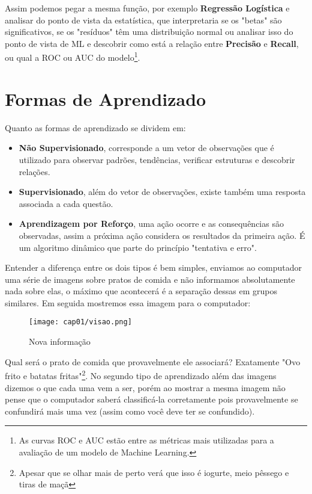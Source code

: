 Assim podemos pegar a mesma função, por exemplo \textbf{Regressão Logística} e analisar do ponto de vista da estatística, que interpretaria se os "betas" são significativos, se os "resíduos" têm uma distribuição normal ou analisar isso do ponto de vista de ML e descobrir como está a relação entre \textbf{Precisão} e \textbf{Recall}, ou qual a ROC ou AUC do modelo\footnote{As curvas ROC e AUC estão entre as métricas mais utilizadas para a avaliação de um modelo de Machine Learning.}.

\section{Formas de Aprendizado}
Quanto as formas de aprendizado se dividem em:
\begin{itemize}[noitemsep]
	\item \textbf{Não Supervisionado}, corresponde a um vetor de observações que é utilizado para observar padrões, tendências, verificar estruturas e descobrir relações.
	\item \textbf{Supervisionado}, além do vetor de observações, existe também uma resposta associada a cada questão.
	\item \textbf{Aprendizagem por Reforço}, uma ação ocorre e as consequências são observadas, assim a próxima ação considera os resultados da primeira ação. É um algoritmo dinâmico que parte do princípio "tentativa e erro".
\end{itemize}

Entender a diferença entre os dois tipos é bem simples, enviamos ao computador uma série de imagens sobre pratos de comida e não informamos absolutamente nada sobre elas, o máximo que acontecerá é a separação dessas em grupos similares. Em seguida mostremos essa imagem para o computador:
\begin{figure}[H]
	\centering\texttt{[image: cap01/visao.png]}
	\caption{Nova informação}
\end{figure}

Qual será o prato de comida que provavelmente ele associará? Exatamente "Ovo frito e batatas fritas"\footnote{Apesar que se olhar mais de perto verá que isso é iogurte, meio pêssego e tiras de maçã}. No segundo tipo de aprendizado além das imagens dizemos o que cada uma vem a ser, porém ao mostrar a mesma imagem não pense que o computador saberá classificá-la corretamente pois provavelmente se confundirá mais uma vez (assim como você deve ter se confundido).

